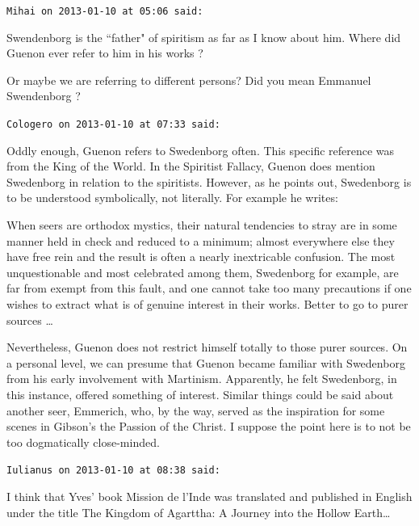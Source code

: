 \begin{footnotesize}\begin{sffamily}



\texttt{Mihai on 2013-01-10 at 05:06 said: }

Swendenborg is the ``father" of spiritism as far as I know about him. Where did Guenon ever refer to him in his works ?

Or maybe we are referring to different persons? Did you mean Emmanuel Swendenborg ?


\hfill

\texttt{Cologero on 2013-01-10 at 07:33 said: }

Oddly enough, Guenon refers to Swedenborg often. This specific reference was from the King of the World. In the Spiritist Fallacy, Guenon does mention Swedenborg in relation to the spiritists. However, as he points out, Swedenborg is to be understood symbolically, not literally. For example he writes:

\begin{quotex}
When seers are orthodox mystics, their natural tendencies to stray are in some manner held in check and reduced to a minimum; almost everywhere else they have free rein and the result is often a nearly inextricable confusion. The most unquestionable and most celebrated among them, Swedenborg for example, are far from exempt from this fault, and one cannot take too many precautions if one wishes to extract what is of genuine interest in their works. Better to go to purer sources … 

\end{quotex}
Nevertheless, Guenon does not restrict himself totally to those purer sources. On a personal level, we can presume that Guenon became familiar with Swedenborg from his early involvement with Martinism. Apparently, he felt Swedenborg, in this instance, offered something of interest. Similar things could be said about another seer, Emmerich, who, by the way, served as the inspiration for some scenes in Gibson's the Passion of the Christ. I suppose the point here is to not be too dogmatically close-minded.


\hfill

\texttt{Iulianus on 2013-01-10 at 08:38 said: }

I think that Yves' book Mission de l'Inde was translated and published in English under the title The Kingdom of Agarttha: A Journey into the Hollow Earth…


\hfill


\end{sffamily}
\end{footnotesize}
